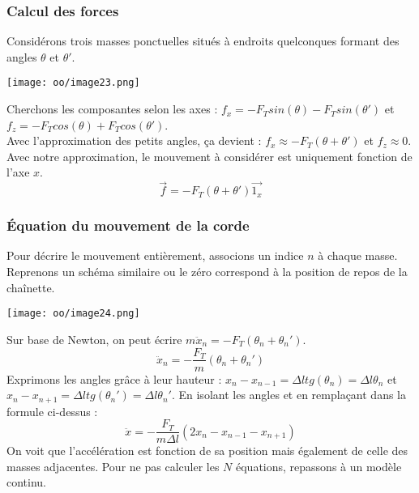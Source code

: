 \documentclass[british,french,11pt, a4paper, openany]{book}
\begin{document}
		\subsubsection{Calcul des forces}
		Considérons trois masses ponctuelles situés à endroits quelconques formant des angles $\theta$ et $\theta '$.
		\begin{center}
			\texttt{[image: oo/image23.png]}
		\end{center}
		Cherchons les composantes selon les axes : $f_x = -F_Tsin(\theta) - F_Tsin(\theta ')$ et $f_z = -F_Tcos(\theta) + F_Tcos(\theta ')$.\\
		Avec l'approximation des petits angles, ça devient : $f_x \approx -F_T(\theta + \theta ')$ et $f_z \approx 0$. Avec notre approximation, le mouvement à considérer est uniquement fonction de l'axe $x$.
		\begin{equation}
			\vec{f} = -F_T(\theta + \theta ')\vec{1_x}
		\end{equation}
		
		\subsubsection{Équation du mouvement de la corde}
		Pour décrire le mouvement entièrement, associons un indice $n$ à chaque masse. Reprenons un schéma similaire ou le zéro correspond à la position de repos de la chaînette.
		\begin{center}
			\texttt{[image: oo/image24.png]}
		\end{center}
		Sur base de Newton, on peut écrire $m\ddot{x}_n = -F_T(\theta_n + \theta_n')$.
		\begin{equation}
			\ddot{x}_n = -\frac{F_T}{m}(\theta_n + \theta_n')
		\end{equation}
		Exprimons les angles grâce à leur hauteur  : $x_n - x_{n-1} = \Delta l tg(\theta_n) = \Delta l \theta_n$ et $x_n - x_{n+1} = \Delta l tg(\theta_n') = \Delta l \theta_n'$. En isolant les angles et en remplaçant dans la formule ci-dessus : 
		\begin{equation}
			\ddot{x} = -\frac{F_T}{m\Delta l}(2x_n - x_{n-1} - x_{n+1})
		\end{equation}
		On voit que l'accélération est fonction de sa position mais également de celle des masses adjacentes. Pour ne pas calculer les $N$ équations, repassons à un modèle continu.\\
		
\end{document}
